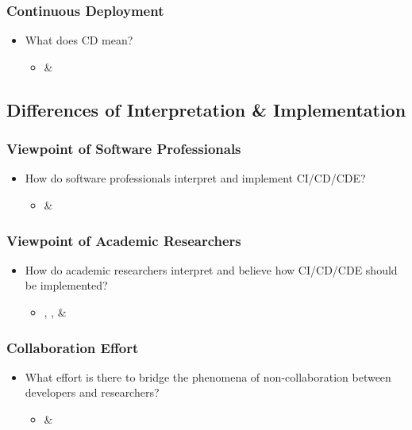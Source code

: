 \documentclass[11pt,a4paper]{article}
\begin{document}
		\subsubsection{Continuous Deployment}
		\begin{itemize}[noitemsep]
			\item What does CD mean?
			\begin{itemize}
				\item \cite{shahin_babar_zhu_2017} \& \cite{stackify_2018}
			\end{itemize}
		\end{itemize}
		
	\subsection{Differences of Interpretation \& Implementation}
		\subsubsection{Viewpoint of Software Professionals}
		\begin{itemize}[noitemsep]
			\item How do software professionals interpret and implement CI/CD/CDE?
			\begin{itemize}
				\item \cite{atkinson_edwards_2018} \& \cite{stackify_2018}
			\end{itemize}
		\end{itemize}
		\subsubsection{Viewpoint of Academic Researchers}
		\begin{itemize}[noitemsep]
			\item How do academic researchers interpret and believe how CI/CD/CDE should be implemented?
			\begin{itemize}
				\item \cite{bosch_2014}, \cite{shahin_babar_zhu_2017}, \& \cite{stahl_2017}
			\end{itemize}
		\end{itemize}
		\subsubsection{Collaboration Effort}
		\begin{itemize}[noitemsep]
			\item What effort is there to bridge the phenomena of non-collaboration between developers and researchers?
			\begin{itemize}
				\item \cite{bosch_2014} \& \cite{stahl_2017}
			\end{itemize}
		\end{itemize}
\end{document}
